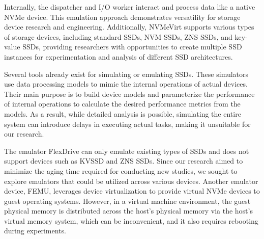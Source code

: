 Internally, the dispatcher and I/O worker interact and process data like a native NVMe device.
This emulation approach demonstrates versatility for storage device research and engineering.
Additionally, NVMeVirt supports various types of storage devices, including standard SSDs, NVM SSDs, ZNS SSDs, and key-value SSDs, providing researchers with opportunities to create multiple SSD instances for experimentation and analysis of different SSD architectures.





Several tools already exist for simulating or emulating SSDs.
These simulators use data processing models to mimic the internal operations of actual devices.
Their main purpose is to build device models and parameterize the performance of internal operations to calculate the desired performance metrics from the models.
As a result, while detailed analysis is possible, simulating the entire system can introduce delays in executing actual tasks, making it unsuitable for our research.

The emulator FlexDrive can only emulate existing types of SSDs and does not support devices such as KVSSD and ZNS SSDs.
Since our research aimed to minimize the aging time required for conducting new studies, we sought to explore emulators that could be utilized across various devices.
Another emulator device, FEMU, leverages device virtualization to provide virtual NVMe devices to guest operating systems.
However, in a virtual machine environment, the guest physical memory is distributed across the host's physical memory via the host's virtual memory system, which can be inconvenient, and it also requires rebooting during experiments.

